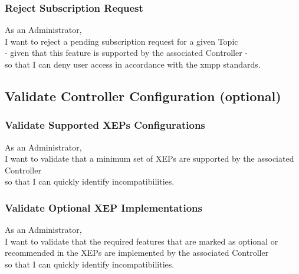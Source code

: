 \subsubsection{Reject Subscription Request}

As an Administrator,\\
I want to reject a pending subscription request for a given Topic\\
- given that this feature is supported by the associated Controller -\\
so that I can deny user access in accordance with the \gls{xmpp} standards.

\subsection{Validate Controller Configuration (optional)}

\subsubsection{Validate Supported XEPs Configurations}
As an Administrator,\\
I want to validate that a minimum set of XEPs are supported by the associated Controller\\
so that I can quickly identify incompatibilities.

\subsubsection{Validate Optional XEP Implementations}
As an Administrator,\\
I want to validate that the required features that are marked as optional or recommended in the XEPs are implemented by the associated Controller\\
so that I can quickly identify incompatibilities.


